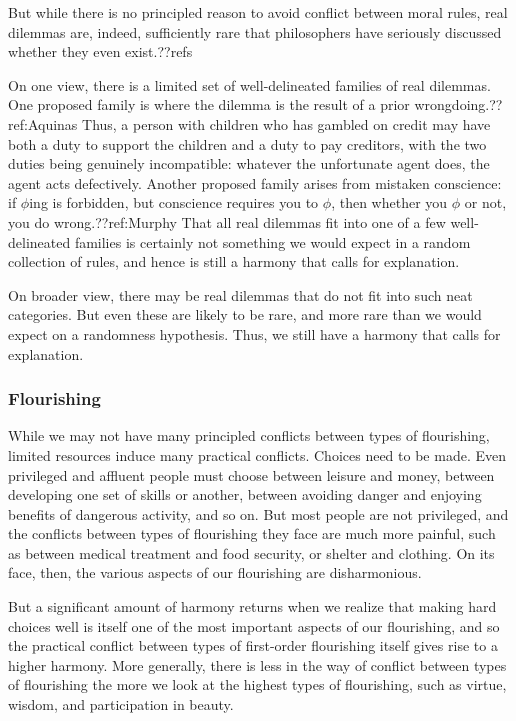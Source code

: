 But while there is no principled reason to avoid conflict between moral rules, real dilemmas are, indeed, sufficiently
rare that philosophers have seriously discussed whether they even exist.??refs 

On one view, there is a limited set of well-delineated families of real dilemmas. One proposed family is where the 
dilemma is the result of a prior wrongdoing.??ref:Aquinas Thus, a person with children who has gambled on credit may have both a duty 
to support the children and a duty to pay creditors, with the two duties being genuinely incompatible: whatever the 
unfortunate agent does, the agent acts defectively. Another proposed family arises from mistaken conscience:
if $\phi$ing is forbidden, but conscience requires you to $\phi$, then whether you $\phi$ or not, you do wrong.??ref:Murphy 
That all real dilemmas fit into one of a few well-delineated families is certainly not something we would expect 
in a random collection of rules, and hence is still a harmony that calls for explanation.

On broader view, there may be real dilemmas that do not fit into such neat categories. But even these are likely to be 
rare, and more rare than we would expect on a randomness hypothesis. Thus, we still have a harmony that calls for
explanation.

\subsubsection{Flourishing}
While we may not have many principled conflicts between types of flourishing, limited resources induce many 
practical conflicts. Choices need to be made.
Even privileged and affluent people must choose between leisure and money, between developing one set of skills or another, 
between avoiding danger and enjoying benefits of dangerous activity, and so on. But most people are not privileged,
and the conflicts between types of flourishing they face are much more painful, such as between medical treatment and food security, or shelter and clothing. On its face, then, the various aspects of our flourishing are disharmonious. 

But a significant amount of harmony returns when we realize that making hard choices well is itself one of the most 
important aspects of our flourishing, and so the practical conflict between types of first-order flourishing itself gives rise
to a higher harmony. More generally, there is less in the way of conflict between types of flourishing the more we look 
at the highest types of flourishing, such as virtue, wisdom, and participation in beauty. 

